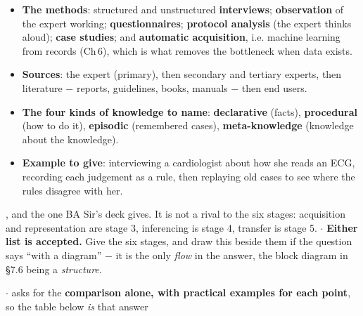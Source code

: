 {\begin{itemize}
        more than they can say, disagree with each other, and are expensive; and what
        they do say has to be turned into rules by someone who is not an expert.
  \item \textbf{The methods}: structured and unstructured \textbf{interviews};
        \textbf{observation} of the expert working; \textbf{questionnaires};
        \textbf{protocol analysis} (the expert thinks aloud); \textbf{case studies}; and
        \textbf{automatic acquisition}, i.e. machine learning from records (Ch\,6), which
        is what removes the bottleneck when data exists.
  \item \textbf{Sources}: the expert (primary), then secondary and tertiary experts,
        then literature $-$ reports, guidelines, books, manuals $-$ then end users.
  \item \textbf{The four kinds of knowledge to name}: \textbf{declarative} (facts),
        \textbf{procedural} (how to do it), \textbf{episodic} (remembered cases),
        \textbf{meta-knowledge} (knowledge about the knowledge).
  \item \textbf{Example to give}: interviewing a cardiologist about how she reads an ECG,
        recording each judgement as a rule, then replaying old cases to see where the
        rules disagree with her.
\end{itemize}
\vspace{1pt}
{\color{sub}\footnotesize {},
and the one BA Sir's deck gives. It is not a rival to the six stages: acquisition and
representation are stage 3, inferencing is stage 4, transfer is stage 5. \gap$\cdot$\gap
\textbf{Either list is accepted.} Give the six stages, and draw this beside them if the
question says ``with a diagram'' $-$ it is the only \emph{flow} in the answer, the block
diagram in \S7.6 being a \emph{structure}.}}


{\color{sub}\footnotesize {}  \gap$\cdot$\gap
{}  asks for the \textbf{comparison alone, with practical examples for each
point}, so the table below \emph{is} that answer}

